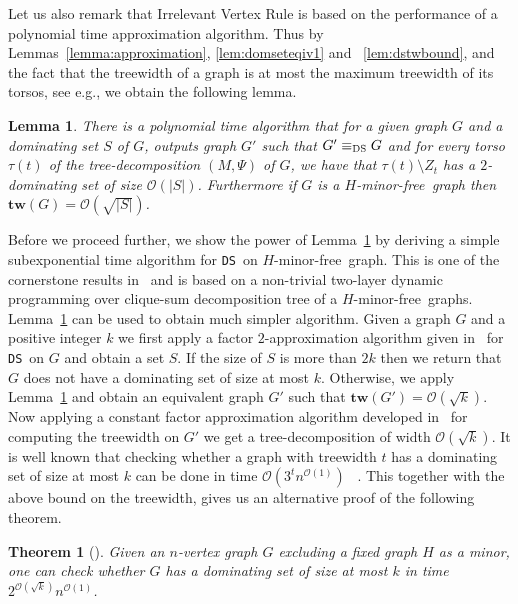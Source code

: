 \documentclass[11pt]{article}
\newtheorem{theorem}{Theorem}
\newtheorem{lemma}{Lemma}
\newcommand{\tw}{{\mathbf{tw}}}
\newcommand{\Hmf}{$H$-minor-free}
\newcommand{\tDS}{{\texttt{\sc DS}}}
\newcommand{\cO}{\mathcal{O}}
\begin{document}
Let us also remark that Irrelevant Vertex Rule is based on the performance of a polynomial time approximation algorithm. Thus by 
Lemmas~\ref{lemma:approximation}, \ref{lem:domseteqiv1} and ~\ref{lem:dstwbound}, and the fact that the treewidth of a graph is at most the maximum treewidth of its torsos, see e.g.\cite{DemaineFHT05sub}, we obtain the following lemma.
\begin{lemma}
\label{lem:sumreductiondomset}
There is a polynomial time algorithm that for  a given graph $G$ and a dominating set $S$ of $G$, outputs graph $G'$ such that $G' \equiv_{\tDS} G $ and for every torso $\tau(t)$ of the tree-decomposition $(M,\Psi)$ of $G$, we have that $\tau(t)\setminus Z_t$ has a $2$-dominating set of size $\cO(|S|)$. Furthermore if $G$ is a \Hmf \, graph then $\tw(G)=\cO(\sqrt{|S|})$. 
\end{lemma}

Before we proceed further, we show the power of Lemma~\ref{lem:sumreductiondomset} by deriving a simple subexponential time algorithm for \tDS \, on \Hmf \, graph. This is one of the cornerstone results in~\cite{DemaineFHT05sub} and is based on a non-trivial two-layer dynamic programming over clique-sum decomposition tree of a \Hmf \, graphs. 
Lemma~\ref{lem:sumreductiondomset} can be used to obtain much simpler algorithm. Given a graph $G$ and a positive integer $k$ we first apply a factor $2$-approximation algorithm given in~\cite{DemaineHaj05,FominLRS10} for \tDS \, on $G$ and obtain a set $S$. If the size of $S$ is more than $2k$ then we return that $G$ does not have a dominating set of size at most $k$. Otherwise,  we apply Lemma~\ref{lem:sumreductiondomset} and obtain an equivalent graph $G'$ such that $\tw(G') = \cO(\sqrt{k})$. Now applying a constant factor approximation algorithm developed in~\cite{DemaineFHT05sub} for computing the treewidth on $G'$ we get a tree-decomposition of width  $\cO(\sqrt{k})$. It is well known that checking whether a graph with treewidth $t$ has a dominating set of size at most $k$ can be done in time $\cO(3^{t} n^{\cO(1)})$ ~\cite{RooijBR09}. This together with the above bound on the treewidth, gives us an alternative proof of the following theorem.
\begin{theorem}[\cite{DemaineHaj05}]\label{THM:Demaine}
Given an $n$-vertex  graph $G$ excluding a fixed graph $H$ as a minor, one can check whether $G$ has a dominating set of size at most $k$ in time $2^{\cO(\sqrt{k})}n^{\cO(1)}$. 
\end{theorem}
\end{document}
